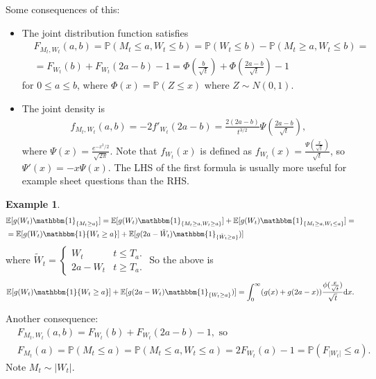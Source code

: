\documentclass{article}
\theoremstyle{definition}
\newtheorem{example}{Example}[section]
\begin{document}
Some consequences of this:
\begin{itemize}
    \item The joint distribution function satisfies
    \begin{align*}
        &F_{M_t,W_t}(a,b)=\mathbb{P}(M_t\le a,W_t\le b) = \mathbb{P}(W_t\le b) - \mathbb{P}(M_t\ge a, W_t\le b) = \\
        &= F_{W_t}(b) + F_{W_t}(2a-b) - 1 = \Phi \left(\frac{b}{\sqrt{t}}\right) + \Phi \left(\frac{2a-b}{\sqrt{t}}\right)-1
    \end{align*}
    for $0\le a\le b$, where $\Phi(x) = \mathbb{P}(Z\le x)$ where $Z\sim N(0,1)$.
    \item The joint density is 
    \begin{align*}
        f_{M_t,W_t}(a,b) = -2 f'_{W_t}(2a-b) = \frac{2(2a-b)}{t^{3/2}} \Psi\left(\frac{2a-b}{\sqrt{t}}\right),
    \end{align*}
    where $\Psi(x) = \frac{e^{-x^2/2}}{\sqrt{2\pi}}$. Note that $f_{W_t}(x)$ is defined as $f_{W_t}(x) = \frac{\Psi(\frac{x}{\sqrt{t}})}{\sqrt{t}}$, so $\Psi'(x)=-x\Psi(x)$. The LHS of the first formula is usually more useful for example sheet questions than the RHS.
\end{itemize}
\begin{example}
    \begin{align*}
        &\mathbb{E}[g(W_t)\mathbbm{1}_{\{M_t \ge a\}}] = \mathbb{E}[g(W_t) \mathbbm{1}_{\{M_t\ge a, W_t \ge a\}}] + \mathbb{E}[g(W_t)\mathbbm{1}_{\{M_t\ge a,W_t\le a\}}] = \\
        &= \mathbb{E}[g(W_t) \mathbbm{1}\{W_t\ge a\}] + \mathbb{E}[g(2a-\tilde{W}_t) \mathbbm{1}_{\{\tilde{W}_t \ge a\}})]
    \end{align*}
    where $\tilde{W}_t = \begin{cases}
        W_t &t \le T_a. \\
        2a-W_t &t \ge T_a. 
    \end{cases}$
    So the above is 
    \begin{align*}
        \mathbb{E}[g(W_t) \mathbbm{1}\{W_t\ge a\}] + \mathbb{E}[g(2a-W_t) \mathbbm{1}_{\{W_t \ge a\}})] = \int_{0}^{\infty} (g(x)+g(2a-x)) \frac{\phi(\frac{x}{\sqrt{t}})}{\sqrt{t}} \mathrm{d}x.
    \end{align*}
\end{example}

Another consequence:
\begin{align*}
    &F_{M_t,W_t}(a,b) = F_{W_t}(b)+F_{W_t}(2a-b)-1,\text{ so}\\
    &F_{M_t}(a) = \mathbb{P}(M_t\le a) = \mathbb{P}(M_t\le a, W_t\le a) = 2 F_{W_t}(a)-1 = \mathbb{P}(F_{|W_t|}\le a).
\end{align*}
Note $M_t \sim |W_t|$.
\vspace{1mm}
\end{document}
